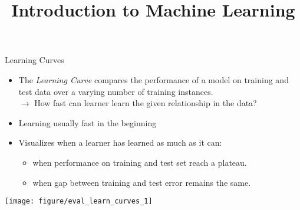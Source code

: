 


\newcommand{\learninggoals}{
  \item XXXXXXXXXXXXXX
  \item XXXXXXXXX
}




\title{Introduction to Machine Learning}
\date{}







\begin{vbframe}{Learning Curves}

\begin{itemize}
\item The \textit{Learning Curve} compares the performance of a model on training and test data over a varying number of training instances.\\
$\rightarrow$ How fast can learner learn the given relationship in the data?
\item Learning usually fast in the beginning %
\item Visualizes when a learner has learned as much as it can:
\begin{itemize}
\item when performance on training and test set reach a plateau.
\item when gap between training and test error remains the same.
\end{itemize}
\end{itemize}





\begin{knitrout}\scriptsize
{}\color{fgcolor}

{\centering \texttt{[image: figure/eval\_learn\_curves\_1]} 

}
\end{knitrout}
\end{vbframe}
